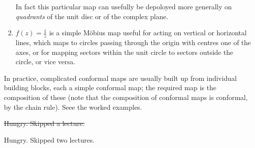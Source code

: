 \documentclass[a4paper]{article}
\begin{document}
\begin{eg}
\begin{enumerate}
    In fact this particular map can usefully be depoloyed more generally on \emph{quadrants} of the unit disc or of the complex plane.
  \item \(f(z) = \frac{1}{z}\) is a simple Möbius map useful for acting on vertical or horizontal lines, which maps to circles passing through the origin with centres one of the axes, or for mapping sectors within the unit circle to sectors outside the circle, or vice versa.
  \end{enumerate}
\end{eg}

In practice, complicated conformal maps are usually built up from individual building blocks, each a simple conformal map; the required map is the composition of these (note that the composition of conformal maps is conformal, by the chain rule). Seee the worked examples.

\sout{Hungry. Skipped a lecture.}

Hungry. Skipped two lectures.
\end{document}
